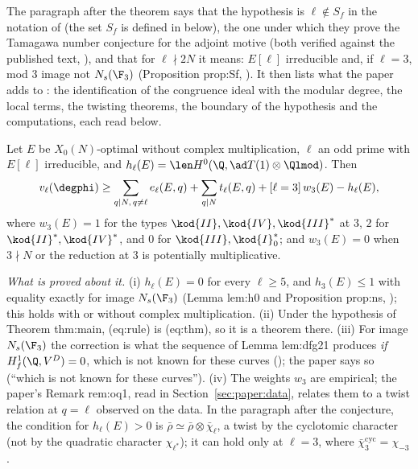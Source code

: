 \begin{sloppypar}
The paragraph after the theorem says that the hypothesis is $\ell\notin S_f$ in the notation of \cite[(31)]{DFG04} (the set $S_f$ is defined in
 below), the one under which they prove the
Tamagawa number conjecture for the adjoint motive \cite[Theorem 0.1]{DFG04} (both verified against the published text, ), and that for
$\ell\nmid2N$ it means: $E[\ell]$ irreducible and, if $\ell=3$, mod $3$ image not $N_s(\F_3)$ (Proposition prop:Sf, ). It then lists what the
paper adds to \cite{DFG04}: the identification of the congruence ideal with the modular degree, the local terms, the twisting theorems,
the boundary of the hypothesis and the computations, each read below.

\begin{conjecture}\label{conj:paper:euler}
Let $E$ be $X_0(N)$-optimal without complex multiplication, $\ell$ an odd prime with $E[\ell]$ irreducible, and $h_\ell(E)=\len H^0(\Q,\ad T(1)\otimes\Qlmod)$. Then
\begin{equation}\label{eq:paper:rule}
v_\ell(\degphi)\ge\sum_{q\mid N,\,q\ne\ell}e_\ell(E,q)+\sum_{q\mid N}t_\ell(E,q)+[\ell=3]\,w_3(E)-h_\ell(E),
\end{equation}
where $w_3(E)=1$ for the types $\kod{II},\kod{IV},\kod{III}^*$ at $3$, $2$ for $\kod{II}^*,\kod{IV}^*$, and $0$ for $\kod{III},\kod{I}_0^*$; and $w_3(E)=0$ when $3\nmid N$ or the reduction at $3$ is potentially
multiplicative.
\end{conjecture}

\noindent\emph{What is proved about it.} (i) $h_\ell(E)=0$ for every $\ell\ge5$, and $h_3(E)\le1$ with equality exactly for image $N_s(\F_3)$ (Lemma lem:h0 and Proposition
prop:ns, ); this holds with or without complex multiplication. (ii) Under the hypothesis of Theorem thm:main, (eq:rule) is
(eq:thm), so it is a theorem there. (iii) For image $N_s(\F_3)$ the correction is what the sequence of Lemma lem:dfg21 produces \emph{if}
$H^1_f(\Q,V^D)=0$, which is not known for these curves (); the paper says so (``which is not known for these curves''). (iv) The weights $w_3$ are empirical; the paper's Remark rem:oq1, read in Section~\ref{sec:paper:data}, relates them to a twist relation at
$q=\ell$ observed on the data. In the paragraph after the conjecture, the condition for $h_\ell(E)>0$ is $\bar\rho\simeq\bar\rho\otimes\bar\chi_\ell$, a twist by the cyclotomic
character (not by the quadratic character $\chi_{\ell^*}$); it can hold only at $\ell=3$, where $\bar\chi_3^{\mathrm{cyc}}=\chi_{-3}$.


\end{sloppypar}
